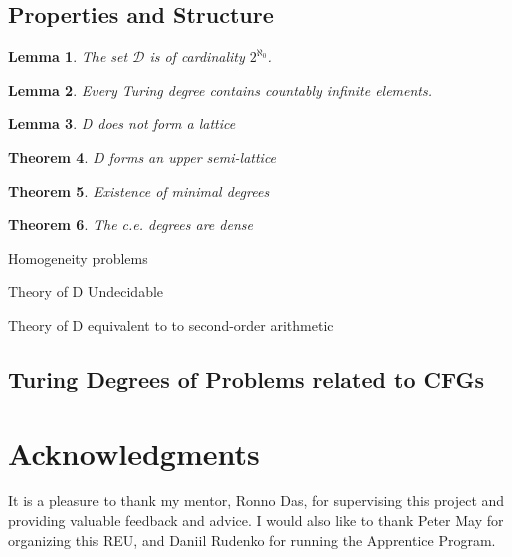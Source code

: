 \documentclass[psamsfonts]{amsart}
\newtheorem{thm}{Theorem}[section]
\newtheorem{lem}[thm]{Lemma}
\theoremstyle{definition}
\theoremstyle{remark}
\numberwithin{equation}{section}
\begin{document}
\subsection{Properties and Structure}
\begin{lem}
  The set $\mathcal{D}$ is of cardinality $2^{\aleph_0}$.
\end{lem}

\begin{lem}
  Every Turing degree contains countably infinite elements.
\end{lem}


\begin{lem}
  D does not form a lattice
  \cite{kleene54_upper_semi_lattic_degrees_recur_unsol}
\end{lem}
\begin{thm}
  D forms an upper semi-lattice
  \cite{kleene54_upper_semi_lattic_degrees_recur_unsol}
\end{thm}

\begin{thm}
  Existence of minimal degrees
  \cite{spector56_degrees_recur_unsol}
  \cite{shoenfield66_theor_minim_degrees}
\end{thm}

\begin{thm}
  The c.e. degrees are dense
  \cite{sacks64:_recur_enumer_degrees_dense}
\end{thm}

Homogeneity problems

Theory of D Undecidable


Theory of D equivalent to to second-order arithmetic \cite{simpson77:_first_order_theor_degrees_recur_unsol}

\subsection{Turing Degrees of Problems related to CFGs}
\cite{REEDY197577}




\section*{Acknowledgments}
It is a pleasure to thank my mentor, Ronno Das, for supervising this project and
providing valuable feedback and advice. I would also like to thank Peter May for
organizing this REU, and Daniil Rudenko for running the Apprentice Program.

\printbibliography
\end{document}
